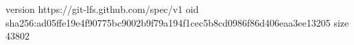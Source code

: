 version https://git-lfs.github.com/spec/v1
oid sha256:ad05ffe19e4f90775bc9002b9f79a194f1cec5b8cd0986f86d406eaa3ee13205
size 43802

